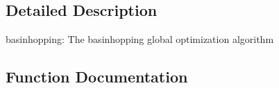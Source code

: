 \subsection{Detailed Description}
\begin{DoxyVerb}basinhopping: The basinhopping global optimization algorithm
\end{DoxyVerb}
 

\subsection{Function Documentation}
\hypertarget{namespacescipy_1_1optimize_1_1__basinhopping_a33599dd3a1af47882707303ea89bb036}{}

